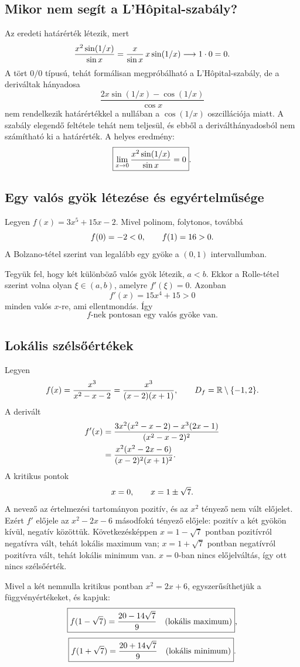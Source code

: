\documentclass{szb-solution}
\begin{document}
\subsection{Mikor nem segít a L'Hôpital-szabály?}

Az eredeti határérték létezik, mert
$$
  \frac{x^2\sin(1/x)}{\sin x}
  =\frac{x}{\sin x}\,x\sin(1/x)
  \longrightarrow1\cdot0=0
  \text.
$$
A tört $0/0$ típusú, tehát formálisan megpróbálható a L'Hôpital-szabály, de
a deriváltak hányadosa
$$
  \frac{2x\sin(1/x)-\cos(1/x)}{\cos x}
$$
nem rendelkezik határértékkel a nullában a $\cos(1/x)$ oszcillációja miatt.
A szabály elegendő feltétele tehát nem teljesül, és ebből a deriválthányadosból
nem számítható ki a határérték. A helyes eredmény:
$$
  \boxed{\displaystyle
  \lim_{x\to0}\frac{x^2\sin(1/x)}{\sin x}=0}
  \text.
$$

\subsection{Egy valós gyök létezése és egyértelműsége}

Legyen $f(x)=3x^5+15x-2$. Mivel polinom, folytonos, továbbá
$$
  f(0)=-2<0,
  \qquad
  f(1)=16>0
  \text.
$$
A Bolzano-tétel szerint van legalább egy gyöke a $(0,1)$ intervallumban.

Tegyük fel, hogy két különböző valós gyök létezik, $a<b$. Ekkor a
Rolle-tétel szerint volna olyan $\xi\in(a,b)$, amelyre $f'(\xi)=0$. Azonban
$$
  f'(x)=15x^4+15>0
$$
minden valós $x$-re, ami ellentmondás. Így
$$
  \boxed{f\text{-nek pontosan egy valós gyöke van}.}
$$

\clearpage
\subsection{Lokális szélsőértékek}

Legyen
$$
  f(x)=\frac{x^3}{x^2-x-2}
  =\frac{x^3}{(x-2)(x+1)},
  \qquad
  D_f=\mathbb R\setminus\{-1,2\}
  \text.
$$
A derivált
\begin{align*}
  f'(x)
  &=\frac{3x^2(x^2-x-2)-x^3(2x-1)}{(x^2-x-2)^2}\\
  &=\frac{x^2(x^2-2x-6)}{(x-2)^2(x+1)^2}
  \text.
\end{align*}
A kritikus pontok
$$
  x=0,
  \qquad
  x=1\pm\sqrt7
  \text.
$$
A nevező az értelmezési tartományon pozitív, és az $x^2$ tényező nem vált
előjelet. Ezért $f'$ előjele az $x^2-2x-6$ másodfokú tényező előjele:
pozitív a két gyökön kívül, negatív közöttük. Következésképpen
$x=1-\sqrt7$ pontban pozitívról negatívra vált, tehát lokális maximum van;
$x=1+\sqrt7$ pontban negatívról pozitívra vált, tehát lokális minimum van.
$x=0$-ban nincs előjelváltás, így ott nincs szélsőérték.

Mivel a két nemnulla kritikus pontban $x^2=2x+6$, egyszerűsíthetjük a
függvényértékeket, és kapjuk:
$$
  \boxed{
  f(1-\sqrt7)=\frac{20-14\sqrt7}{9}
  \quad\text{(lokális maximum)}}
  \text,
$$
$$
  \boxed{
  f(1+\sqrt7)=\frac{20+14\sqrt7}{9}
  \quad\text{(lokális minimum)}}
  \text.
$$
\end{document}
